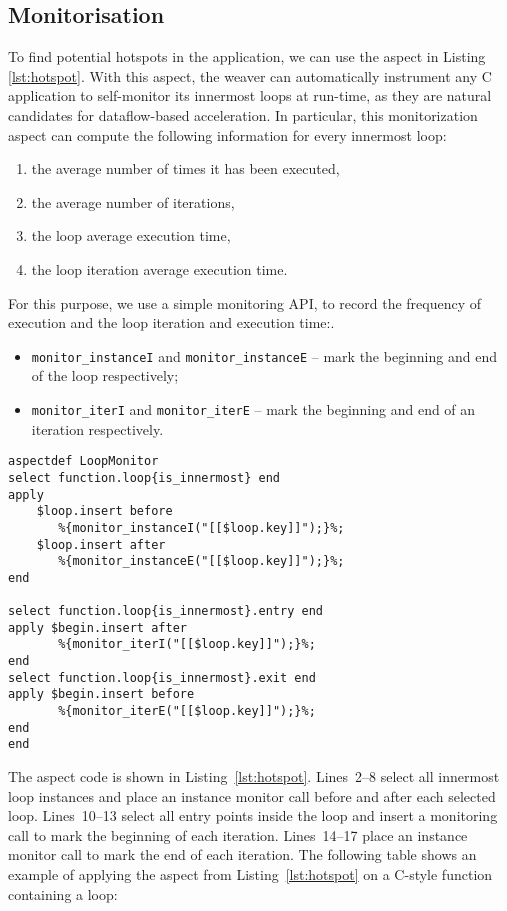 \subsection{Monitorisation}
\label{sect:asp_mon}
To find potential hotspots in the application, we can use the aspect
in Listing \ref{lst:hotspot}.  With this aspect, the weaver can
automatically instrument any C application to self-monitor its
innermost loops at run-time, as they are natural candidates for
dataflow-based acceleration. In particular, this monitorization aspect
can compute the following information for every innermost loop:
\begin{enumerate}
\item the average number of times it has been executed,
\item the average number of iterations,
\item the loop average execution time,
\item the loop iteration average execution time.
\end{enumerate}

For this purpose, we use a simple monitoring API, to record the
frequency of execution and the loop iteration and execution time:.
\begin{itemize}
\item \texttt{monitor\_instanceI} and \texttt{monitor\_instanceE} -- mark
  the beginning and end of the loop respectively;
\item \texttt{monitor\_iterI} and \texttt{monitor\_iterE} -- mark the
  beginning and end of an iteration respectively.
\end{itemize}

\lstset{style=lara}
\begin{lstlisting}[caption={Aspect that instruments the application to monitor loop
  activity. The information generated can be used to identify
  hotspots.}, label={lst:hotspot}]
aspectdef LoopMonitor
select function.loop{is_innermost} end
apply
    $loop.insert before
       %{monitor_instanceI("[[$loop.key]]");}%;
    $loop.insert after
       %{monitor_instanceE("[[$loop.key]]");}%;
end

select function.loop{is_innermost}.entry end
apply $begin.insert after
       %{monitor_iterI("[[$loop.key]]");}%;
end
select function.loop{is_innermost}.exit end
apply $begin.insert before
       %{monitor_iterE("[[$loop.key]]");}%;
end
end
\end{lstlisting}

The aspect code is shown in Listing~\ref{lst:hotspot}. Lines~2--8 select
all innermost loop instances and place an instance monitor call before
and after each selected loop. Lines~10--13 select all entry points
inside the loop and insert a monitoring call to mark the beginning of
each iteration. Lines~14--17 place an instance monitor call to mark
the end of each iteration. The following table shows an example of
applying the aspect from Listing~\ref{lst:hotspot} on a C-style function
containing a loop:

